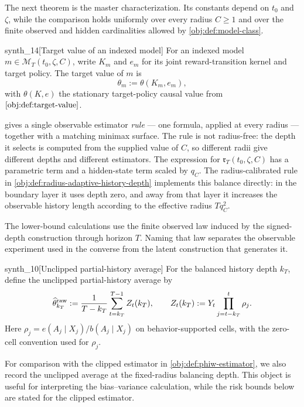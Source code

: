 The next theorem is the master characterization. Its constants depend on \(t_0\) and \(\zeta\), while the comparison holds uniformly over every radius \(C\ge1\) and over the finite observed and hidden cardinalities allowed by \cref{obj:def:model-class}.

\begin{definitionv}{synth_14}[Target value of an indexed model]
For an indexed model \(m\in\mathcal M_T(t_0,\zeta,C)\), write \(K_m\) and \(e_m\) for its joint reward-transition kernel and target policy. The target value of \(m\) is
\[
\theta_m:=\theta(K_m,e_m),
\]
with \(\theta(K,e)\) the stationary target-policy causal value from \(\cref{obj:def:target-value}\).
\end{definitionv}

 gives a single observable estimator \emph{rule} --- one formula, applied at every radius --- together with a matching minimax surface. The rule is not radius-free: the depth it selects is computed from the supplied value of \(C\), so different radii give different depths and different estimators. The expression for \(\mathfrak r_T(t_0,\zeta,C)\) has a parametric term and a hidden-state term scaled by \(q_C\). The radius-calibrated rule in \cref{obj:def:radius-adaptive-history-depth} implements this balance directly: in the boundary layer it uses depth zero, and away from that layer it increases the observable history length according to the effective radius \(Tq_C^2\).

The lower-bound calculations use the finite observed law induced by the signed-depth construction through horizon \(T\). Naming that law separates the observable experiment used in the converse from the latent construction that generates it.

\begin{definitionv}{synth_10}[Unclipped partial-history average]
For the balanced history depth \(k_T\), define the unclipped partial-history average by
\[
\widehat\theta^{\rm raw}_{k_T}
:=
\frac{1}{T-k_T}\sum_{t=k_T}^{T-1} Z_t(k_T),
\qquad
Z_t(k_T):=
Y_t\prod_{j=t-k_T}^{t}\rho_j .
\]
Here \(\rho_j=e(A_j\mid X_j)/b(A_j\mid X_j)\) on behavior-supported cells, with the zero-cell convention used for \(\rho_j\).
\end{definitionv}

For comparison with the clipped estimator in \cref{obj:def:phiw-estimator}, we also record the unclipped average at the fixed-radius balancing depth. This object is useful for interpreting the bias--variance calculation, while the risk bounds below are stated for the clipped estimator.


